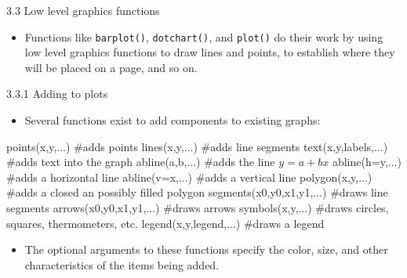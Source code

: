 \documentclass[
  9pt,
  a4paper,
  ignorenonframetext,
  notheorems]{beamer}
\newenvironment{Shaded}{\begin{snugshade}}{\end{snugshade}}
\newcommand{\AttributeTok}[1]{\textcolor[rgb]{0.40,0.45,0.13}{#1}}
\newcommand{\CommentTok}[1]{\textcolor[rgb]{0.37,0.37,0.37}{#1}}
\newcommand{\FunctionTok}[1]{\textcolor[rgb]{0.28,0.35,0.67}{#1}}
\newcommand{\NormalTok}[1]{\textcolor[rgb]{0.00,0.23,0.31}{#1}}
\providecommand{\tightlist}{%
  \setlength{\itemsep}{0pt}\setlength{\parskip}{0pt}}\usepackage{longtable,booktabs,array}
\begin{document}
\begin{frame}[fragile]{3.3 Low level graphics functions}
\protect\hypertarget{low-level-graphics-functions}{}
\begin{itemize}
\tightlist
\item
  Functions like \texttt{barplot()}, \texttt{dotchart()}, and
  \texttt{plot()} do their work by using low level graphics functions to
  draw lines and points, to establish where they will be placed on a
  page, and so on.
\end{itemize}

\begin{block}{3.3.1 Adding to plots}
\protect\hypertarget{adding-to-plots}{}
\begin{itemize}
\tightlist
\item
  Several functions exist to add components to existing graphs:
\end{itemize}

\begin{Shaded}
\begin{Highlighting}[]
\FunctionTok{points}\NormalTok{(x,y,...) }\CommentTok{\#adds points}
\FunctionTok{lines}\NormalTok{(x,y,...)  }\CommentTok{\#adds line segments}
\FunctionTok{text}\NormalTok{(x,y,labels,...)  }\CommentTok{\#adds text into the graph}
\FunctionTok{abline}\NormalTok{(a,b,...) }\CommentTok{\#adds the line $y=a+bx$}
\FunctionTok{abline}\NormalTok{(}\AttributeTok{h=}\NormalTok{y,...) }\CommentTok{\#adds a horizontal line}
\FunctionTok{abline}\NormalTok{(}\AttributeTok{v=}\NormalTok{x,...) }\CommentTok{\#adds a vertical line}
\FunctionTok{polygon}\NormalTok{(x,y,...)  }\CommentTok{\#adds a closed an possibly filled polygon}
\FunctionTok{segments}\NormalTok{(x0,y0,x1,y1,...) }\CommentTok{\#draws line segments}
\FunctionTok{arrows}\NormalTok{(x0,y0,x1,y1,...) }\CommentTok{\#draws arrows}
\FunctionTok{symbols}\NormalTok{(x,y,...)  }\CommentTok{\#draws circles, squares, thermometers, etc.}
\FunctionTok{legend}\NormalTok{(x,y,legend,...)  }\CommentTok{\#draws a legend}
\end{Highlighting}
\end{Shaded}

\begin{itemize}
\tightlist
\item
  The optional arguments to these functions specify the color, size, and
  other characteristics of the items being added.
\end{itemize}
\end{block}
\end{frame}
\end{document}
